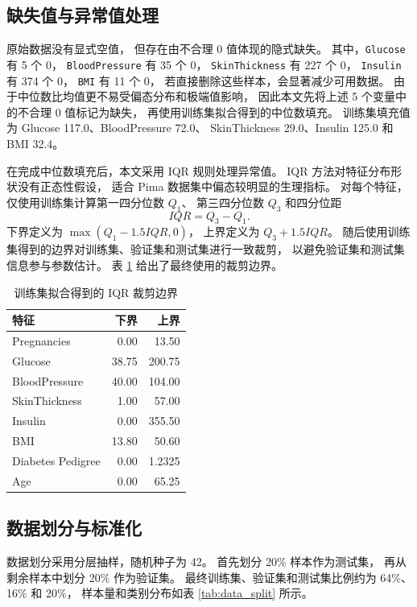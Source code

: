 \subsection{缺失值与异常值处理}

原始数据没有显式空值，
但存在由不合理 0 值体现的隐式缺失。
其中，\texttt{Glucose} 有 5 个 0，
\texttt{BloodPressure} 有 35 个 0，
\texttt{SkinThickness} 有 227 个 0，
\texttt{Insulin} 有 374 个 0，
\texttt{BMI} 有 11 个 0，
若直接删除这些样本，会显著减少可用数据。
由于中位数比均值更不易受偏态分布和极端值影响，
因此本文先将上述 5 个变量中的不合理 0 值标记为缺失，
再使用训练集拟合得到的中位数填充。
训练集填充值为 Glucose 117.0、BloodPressure 72.0、
SkinThickness 29.0、Insulin 125.0 和 BMI 32.4。

在完成中位数填充后，本文采用 IQR 规则处理异常值。
IQR 方法对特征分布形状没有正态性假设，
适合 Pima 数据集中偏态较明显的生理指标。
对每个特征，仅使用训练集计算第一四分位数 $Q_1$、
第三四分位数 $Q_3$ 和四分位距
\[
  IQR = Q_3 - Q_1 .
\]
下界定义为 $\max(Q_1 - 1.5IQR, 0)$，
上界定义为 $Q_3 + 1.5IQR$。
随后使用训练集得到的边界对训练集、验证集和测试集进行一致裁剪，
以避免验证集和测试集信息参与参数估计。
表 \ref{tab:iqr_bounds} 给出了最终使用的裁剪边界。

\begin{table}[H]
  \caption{训练集拟合得到的 IQR 裁剪边界}
  \label{tab:iqr_bounds}
  \centering
  \scriptsize
  \begin{tabular*}{\linewidth}{@{\extracolsep{\fill}}lrr@{}}
    \toprule
    特征 & 下界 & 上界 \\
    \midrule
    Pregnancies & 0.00 & 13.50 \\
    Glucose & 38.75 & 200.75 \\
    BloodPressure & 40.00 & 104.00 \\
    SkinThickness & 1.00 & 57.00 \\
    Insulin & 0.00 & 355.50 \\
    BMI & 13.80 & 50.60 \\
    Diabetes Pedigree & 0.00 & 1.2325 \\
    Age & 0.00 & 65.25 \\
    \bottomrule
  \end{tabular*}
\end{table}

\subsection{数据划分与标准化}

数据划分采用分层抽样，随机种子为 42。
首先划分 20\% 样本作为测试集，
再从剩余样本中划分 20\% 作为验证集。
最终训练集、验证集和测试集比例约为 64\%、16\% 和 20\%，
样本量和类别分布如表 \ref{tab:data_split} 所示。

